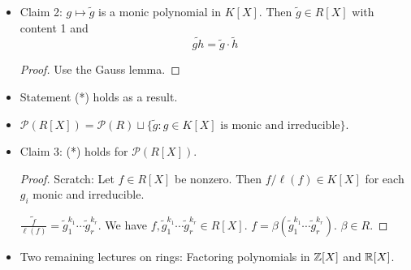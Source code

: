 \documentclass[../notes.tex]{subfiles}
\begin{document}
\begin{itemize}
\begin{proof}
        Denote $\beta g$ by $\tilde{g}$. Then the claim is that $\tilde{g}\in R[X]$ has content 1. Thus,
        \begin{equation*}
            \frac{\tilde{g}}{\ell(\tilde{g})} = g
        \end{equation*}
    \end{proof}
    \item Claim 2: $g\mapsto\tilde{g}$ is a monic polynomial in $K[X]$. Then $\tilde{g}\in R[X]$ with content 1 and
    \begin{equation*}
        \widetilde{gh} = \tilde{g}\cdot\tilde{h}
    \end{equation*}
    \begin{proof}
        Use the Gauss lemma.
    \end{proof}
    \item Statement (*) holds as a result.
    \item $\mathcal{P}(R[X])=\mathcal{P}(R)\sqcup\{\tilde{g}:g\in K[X]\text{ is monic and irreducible}\}$.
    \item Claim 3: (*) holds for $\mathcal{P}(R[X])$.
    \begin{proof}
        Scratch: Let $f\in R[X]$ be nonzero. Then $f/\ell(f)\in K[X]$ for each $g_i$ monic and irreducible.\par
        $\widetilde{\frac{f}{\ell(f)}}=\tilde{g}_1^{k_1}\cdots\tilde{g}_r^{k_r}$. We have $f,\tilde{g}_1^{k_1}\cdots\tilde{g}_r^{k_r}\in R[X]$. $f=\beta(\tilde{g}_1^{k_1}\cdots\tilde{g}_r^{k_r})$. $\beta\in R$.
    \end{proof}
    \item Two remaining lectures on rings: Factoring polynomials in $\mathbb{Z}[X]$ and $\mathbb{R}[X]$.
\end{itemize}
\end{document}
